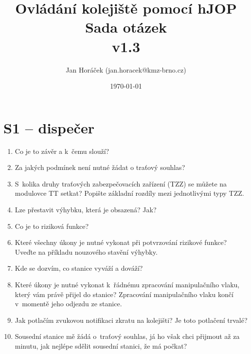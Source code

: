 \documentclass[12pt,a4paper]{article}
\begin{document}
\thispagestyle{empty}
\noindent

\setlength{\droptitle}{-5em}

\title{
\Large Ovládání kolejiště pomocí hJOP\\
\LARGE Sada otázek\\
\small v1.3}
\author{Jan Horáček (jan.horacek@kmz-brno.cz)}
\date{\today}
\maketitle

\section*{S1 – dispečer}

\begin{enumerate}[leftmargin=*]
\item Co je to závěr a k~čemu slouží?

\item Za jakých podmínek není nutné žádat o traťový souhlas?

\item S~kolika druhy traťových zabezpečovacích zařízení (TZZ) se můžete na
modulovce TT setkat? Popište základní rozdíly mezi jednotlivými typy TZZ.

\item Lze přestavit výhybku, která je obsazená? Jak?

\item Co je to riziková funkce?

\item Které všechny úkony je nutné vykonat při potvrzování rizikové funkce?
Uveďte na příkladu nouzového stavění výhybky.

\item Kde se dozvím, co stanice vyváží a dováží?

\item Které úkony je nutné vykonat k~řádnému zpracování manipulačního vlaku,
který vám právě přijel do stanice? Zpracování manipulačního vlaku končí
v~momentě jeho odjezdu ze stanice.

\item Jak potlačím zvukovou notifikaci zkratu na kolejišti? Je toto potlačení
trvalé?

\item Sousední stanice mě žádá o~traťový souhlas, já ho však chci přijmout až
za minutu, jak nejlépe sdělit sousední stanici, že má počkat?


\end{enumerate}
\end{document}

